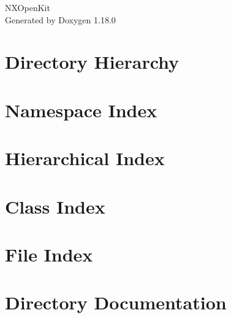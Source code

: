 \documentclass[twoside]{book}
\newcommand{\+}{\discretionary{\mbox{\scriptsize$\hookleftarrow$}}{}{}}
\newcommand{\clearemptydoublepage}{%
    \newpage{\pagestyle{empty}\cleardoublepage}%
  }
\begin{document}
  \raggedbottom
    \hypersetup{pageanchor=false,
                bookmarksnumbered=true,
                pdfencoding=unicode
               }
  \begin{titlepage}
  \vspace*{7cm}
  \begin{center}%
  {\Large NXOpen\+Kit}\\
  \vspace*{1cm}
  {\large Generated by Doxygen 1.18.0}\\
  \end{center}
  \end{titlepage}
  \clearemptydoublepage
  \tableofcontents
  \clearemptydoublepage
  \hypersetup{pageanchor=true}
\chapter{Directory Hierarchy}

\chapter{Namespace Index}

\chapter{Hierarchical Index}

\chapter{Class Index}

\chapter{File Index}

\chapter{Directory Documentation}





\end{document}
